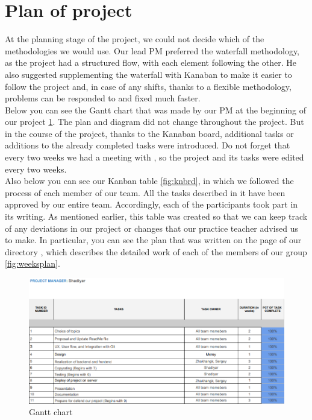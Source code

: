 \section{Plan of project}
At the planning stage of the project, we could not decide which of the methodologies we would use. Our lead PM preferred the waterfall methodology, as the project had a structured flow, with each element following the other. He also suggested supplementing the waterfall with Kanaban to make it easier to follow the project and, in case of any shifts, thanks to a flexible methodology, problems can be responded to and fixed much faster.
\\
Below you can see the Gantt chart that was made by our PM at the beginning of our project \ref{fig:plan1}. The plan and diagram did not change throughout the project. But in the course of the project, thanks to the Kanaban board, additional tasks or additions to the already completed tasks were introduced. Do not forget that every two weeks we had a meeting with {\mycoach}, so the project and its tasks were edited every two weeks.
\\
Also below you can see our Kanban table \ref{fig:knbrd}, in which we followed the process of each member of our team. All the tasks described in it have been approved by our entire team. Accordingly, each of the participants took part in its writing. As mentioned earlier, this table was created so that we can keep track of any deviations in our project or changes that our practice teacher {\mycoach} advised us to make. In particular, you can see the plan that was written on the page of our directory \cite{gitlink}, which describes the detailed work of each of the members of our group \ref{fig:weeksplan}.



\begin{figure}[ht]
    \centering
    \includegraphics[scale=0.5]{plan1.png}
    \caption{Gantt chart}
    \label{fig:plan1}
\end{figure}

